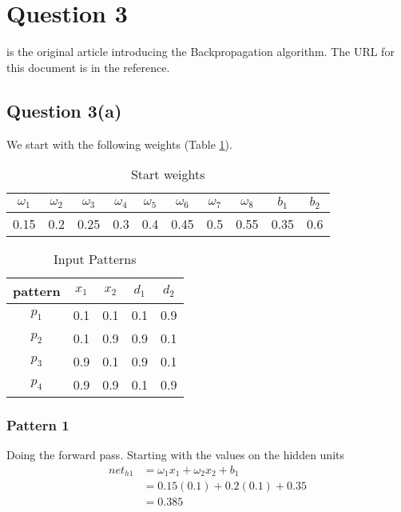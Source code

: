 \documentclass[10pt,a4paper]{article}
\begin{document}
\section{Question 3}

\cite{rumel} is the original article introducing the Backpropagation algorithm. The URL for this document is in the reference.

\subsection{Question 3(a)}

We start with the following weights (Table \ref{table1}).

\begin{table}
\begin{tabular}{|c|c|c|c|c|c|c|c|c|c|}
\hline
$\omega_1$ & $\omega_2$ & $\omega_3$ & $\omega_4$ & $\omega_5$ & $\omega_6$ & $\omega_7$ & $\omega_8$ & $b_1$ & $b_2$\\
\hline
0.15 &0.2 &0.25 & 0.3 & 0.4 & 0.45 & 0.5 & 0.55 & 0.35 & 0.6 \\
\hline
\end{tabular}
\caption{Start weights}\label{table1}
\end{table}

\begin{table}
\begin{tabular}{|c|c|c|c|c|}
\hline
pattern & $x_1$ & $x_2$ & $d_1$ & $d_2$ \\
\hline
$p_1$ & 0.1 & 0.1 & 0.1 & 0.9 \\
$p_2$ & 0.1 & 0.9 & 0.9 & 0.1 \\
$p_3$ & 0.9 & 0.1 & 0.9 & 0.1 \\
$p_4$ & 0.9 & 0.9 & 0.1 & 0.9 \\
\hline
\end{tabular}
\caption{Input Patterns}\label{inputPatters}
\end{table}




\subsubsection{Pattern 1}
Doing the forward pass. Starting with the values on the hidden units
\begin{equation}
\begin{split}
net_{h1} &= \omega_1 x_1 + \omega_2 x_2 + b_1 \\
         &= 0.15(0.1) + 0.2(0.1) + 0.35 \\
         &= 0.385\\
\end{split}
\end{equation}
\end{document}
